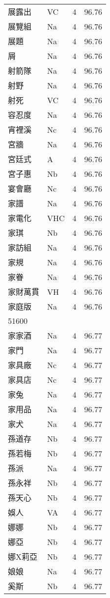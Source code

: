\documentclass[twocolumn]{book}
\begin{document}
\begin{supertabular}{llrr}
展露出 & VC & 4 &  96.76\\
展覽組 & Na & 4 &  96.76\\
展題 & Na & 4 &  96.76\\
屑 & Na & 4 &  96.76\\
射箭隊 & Na & 4 &  96.76\\
射野 & Na & 4 &  96.76\\
射死 & VC & 4 &  96.76\\
容忍度 & Na & 4 &  96.76\\
宵裡溪 & Nc & 4 &  96.76\\
宮牆 & Na & 4 &  96.76\\
宮廷式 & A & 4 &  96.76\\
宮子惠 & Nb & 4 &  96.76\\
宴會廳 & Nc & 4 &  96.76\\
家譜 & Na & 4 &  96.76\\
家電化 & VHC & 4 &  96.76\\
家琪 & Nb & 4 &  96.76\\
家訪組 & Na & 4 &  96.76\\
家規 & Na & 4 &  96.76\\
家眷 & Na & 4 &  96.76\\
家財萬貫 & VH & 4 &  96.76\\
家庭版 & Na & 4 &  96.76\\
51600\\
家家酒 & Na & 4 &  96.77\\
家門 & Na & 4 &  96.77\\
家具廠 & Nc & 4 &  96.77\\
家具店 & Nc & 4 &  96.77\\
家兔 & Na & 4 &  96.77\\
家用品 & Na & 4 &  96.77\\
家犬 & Na & 4 &  96.77\\
孫道存 & Nb & 4 &  96.77\\
孫若梅 & Nb & 4 &  96.77\\
孫派 & Na & 4 &  96.77\\
孫永祥 & Nb & 4 &  96.77\\
孫天心 & Nb & 4 &  96.77\\
娛人 & VA & 4 &  96.77\\
娜娜 & Nb & 4 &  96.77\\
娜亞 & Nb & 4 &  96.77\\
娜X莉亞 & Nb & 4 &  96.77\\
娘娘 & Na & 4 &  96.77\\
奚斯 & Nb & 4 &  96.77\\

\end{supertabular}
\end{document}
